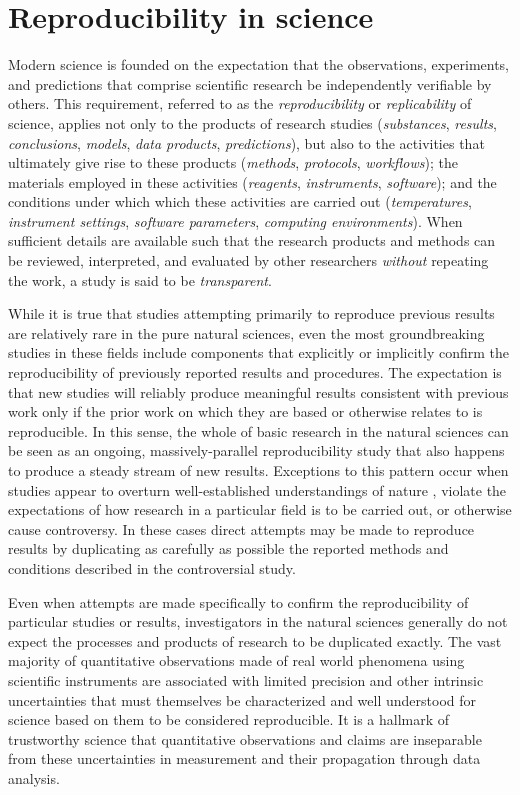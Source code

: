 \section{Reproducibility in science}\label{sec-reproducibility}

Modern science is founded on the expectation that the observations, experiments, and
	predictions that comprise scientific research be independently verifiable by others.
This requirement, referred to as the \emph{reproducibility} or \emph{replicability} of 
	science, applies not only to the products of research studies (\emph{substances}, 
	\emph{results}, \emph{conclusions}, \emph{models}, \emph{data products}, 
	\emph{predictions}), but also to the activities that ultimately give rise to these
	products (\emph{methods}, \emph{protocols}, \emph{workflows}); the materials 
	employed in these activities (\emph{reagents}, \emph{instruments}, 
	\emph{software}); and the conditions 
	under which which these activities are carried out (\emph{temperatures},
	\emph{instrument settings}, \emph{software parameters},
	\emph{computing environments}).  When sufficient details are available
	such that the research products and methods can be reviewed, interpreted, and
	evaluated by other researchers \emph{without} repeating the work, a study is said to be 
	\emph{transparent}.

While it is true that studies attempting primarily to reproduce previous results are relatively rare in the
	pure natural sciences, even the most groundbreaking studies in these fields include components	
	that explicitly or implicitly confirm the reproducibility of previously reported results and procedures.
The expectation is that new studies will reliably produce meaningful results consistent with previous work 
	only if the prior work on which they are based or otherwise relates to is reproducible.
In this sense, the whole of basic research in the natural sciences can be seen as an ongoing, massively-parallel
	reproducibility study that also happens to produce a steady stream of new results.
Exceptions to this pattern occur when studies appear to overturn
well-established understandings of nature \cite{kuhn1962structure},
	violate the expectations of how research in a particular field is to be carried out, or otherwise cause controversy.
In these cases direct attempts may be made to reproduce results by duplicating as carefully as possible
	the reported methods and conditions described in the controversial study.

Even when attempts are made specifically to confirm the reproducibility of particular studies or results, investigators in
	the natural sciences generally do not expect the processes and products of research to be duplicated exactly.
The vast majority of quantitative observations made of real world phenomena using scientific instruments
	are associated with limited precision and other intrinsic uncertainties that must themselves be characterized
	and well understood for science based on them to be considered reproducible.
It is a hallmark of trustworthy science that quantitative observations and claims are inseparable from these 
	uncertainties in measurement and their propagation through data analysis.

